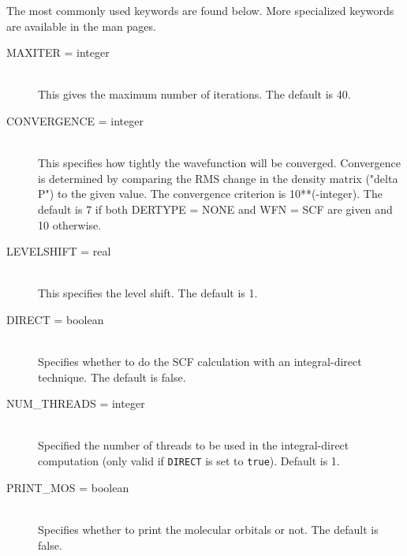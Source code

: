 The most commonly used keywords are found below.  More specialized keywords
are available in the man pages.

\begin{description}
\item[MAXITER = integer]\mbox{}\\
This gives the maximum number of iterations.  The default is 40.
\item[CONVERGENCE = integer]\mbox{}\\
This specifies how tightly the wavefunction will be converged.
Convergence is determined by comparing the RMS change in the
density matrix ("delta P") to the given value.  The convergence
criterion is 10**(-integer).  The default is 7 if both DERTYPE
= NONE and WFN = SCF are given and 10 otherwise.
\item[LEVELSHIFT = real]\mbox{}\\
This specifies the level shift.  The default is 1.
\item[DIRECT = boolean]\mbox{}\\
Specifies whether to do the SCF calculation with an integral-direct
technique.  The default is false.
\item[NUM\_THREADS = integer]\mbox{}\\
Specified the number of threads to be used in the integral-direct
computation (only valid if {\tt DIRECT} is set to {\tt true}).
Default is 1.
\item[PRINT\_MOS = boolean]\mbox{}\\
Specifies whether to print the molecular orbitals or not.  The default
is false.
\end{description}
